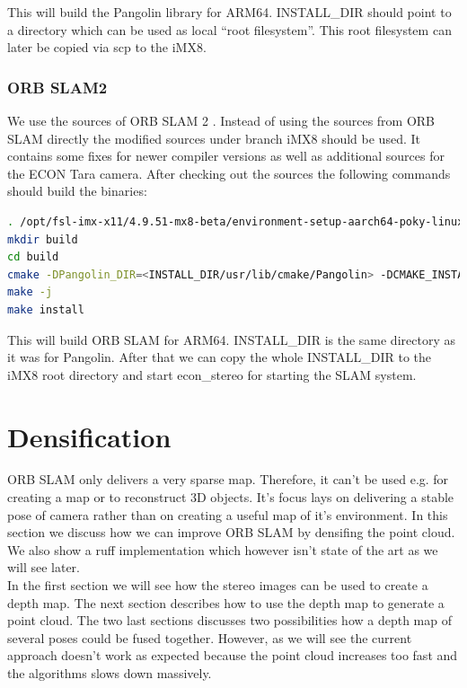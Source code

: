 \documentclass[11pt,a4paper,titlepage,oneside]{report}
\begin{document}
This will build the Pangolin library for ARM64. INSTALL\_DIR should point to a directory which can be used as local ``root filesystem''. This root filesystem can later be copied via scp to the iMX8.

\subsection{ORB SLAM2}
We use the sources of ORB SLAM 2 \cite{orbslam2_impl}. Instead of using the sources from ORB SLAM directly the modified sources \cite{orbslam2_se} under branch iMX8 should be used. It contains some fixes for newer compiler versions as well as additional sources for the ECON Tara camera. After checking out the sources the following commands should build the binaries:\\
\begin{lstlisting}[language=bash]
. /opt/fsl-imx-x11/4.9.51-mx8-beta/environment-setup-aarch64-poky-linux
mkdir build
cd build
cmake -DPangolin_DIR=<INSTALL_DIR/usr/lib/cmake/Pangolin> -DCMAKE_INSTALL_PREFIX=<INSTALL_DIR> ..
make -j
make install
\end{lstlisting}

This will build ORB SLAM for ARM64. INSTALL\_DIR is the same directory as it was for Pangolin. After that we can copy the whole INSTALL\_DIR to the iMX8 root directory and start econ\_stereo for starting the SLAM system.

\chapter{Densification}

ORB SLAM only delivers a very sparse map. Therefore, it can't be used e.g. for creating a map or to reconstruct 3D objects. It's focus lays on delivering a stable pose of camera rather than on creating a useful map of it's environment. In this section we discuss how we can improve ORB SLAM by densifing the point cloud. We also show a ruff implementation which however isn't state of the art as we will see later.\\
In the first section we will see how the stereo images can be used to create a depth map. The next section describes how to use the depth map to generate a point cloud. The two last sections discusses two possibilities how a depth map of several poses could be fused together. However, as we will see the current approach doesn't work as expected because the point cloud increases too fast and the algorithms slows down massively.
\end{document}
